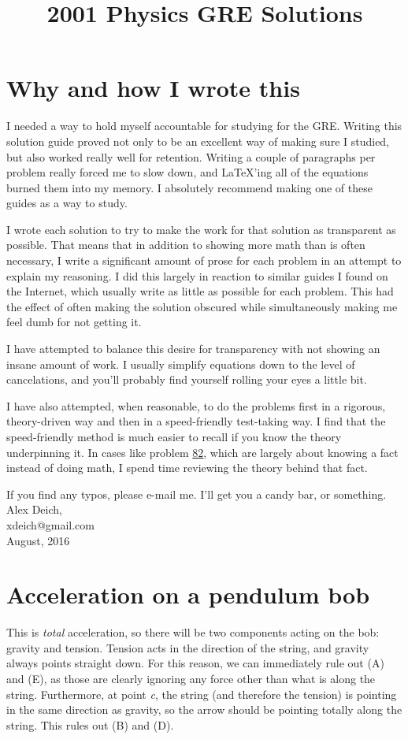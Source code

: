\documentclass[11pt]{paper}
\title{2001 Physics GRE Solutions}
\author{}
\begin{document}
\maketitle
\section*{Why and how I wrote this}
I needed a way to hold myself accountable for studying for the GRE.  Writing this solution guide proved not only to be an excellent way of making sure I studied, but also worked really well for retention.  Writing a couple of paragraphs per problem really forced me to slow down, and \LaTeX'ing all of the equations burned them into my memory.  I absolutely recommend making one of these guides as a way to study.

I wrote each solution to try to make the work for that solution as transparent as possible.  That means that in addition to showing more math than is often necessary, I write a significant amount of prose for each problem in an attempt to explain my reasoning.  I did this largely in reaction to similar guides I found on the Internet, which usually write as little as possible for each problem.  This had the effect of often making the solution obscured while simultaneously making me feel dumb for not getting it.

I have attempted to balance this desire for transparency with not showing an insane amount of work.  I usually simplify equations down to the level of cancelations, and you'll probably find yourself rolling your eyes a little bit.

I have also attempted, when reasonable, to do the problems first in a rigorous, theory-driven way and then in a speed-friendly test-taking way.  I find that the speed-friendly method is much easier to recall if you know the theory underpinning it.  In cases like problem \hyperlink{section.82}{82}, which are largely about knowing a fact instead of doing math, I spend time reviewing the theory behind that fact.

If you find any typos, please e-mail me.  I'll get you a candy bar, or something.\\

Alex Deich,\\
\phantom{.}\hspace{10pt} xdeich@gmail.com\\
\phantom{.}\hspace{10pt} August, 2016
\newpage
\tableofcontents
\newpage
\section{Acceleration on a pendulum bob}
This is \emph{total} acceleration, so there will be two components acting on the bob: gravity and tension.  Tension acts in the direction of the string, and gravity always points straight down.  For this reason, we can immediately rule out (A) and (E), as those are clearly ignoring any force other than what is along the string.  Furthermore, at point \emph{c}, the string (and therefore the tension) is pointing in the same direction as gravity, so the arrow should be pointing totally along the string.  This rules out (B) and (D).\\
\end{document}
